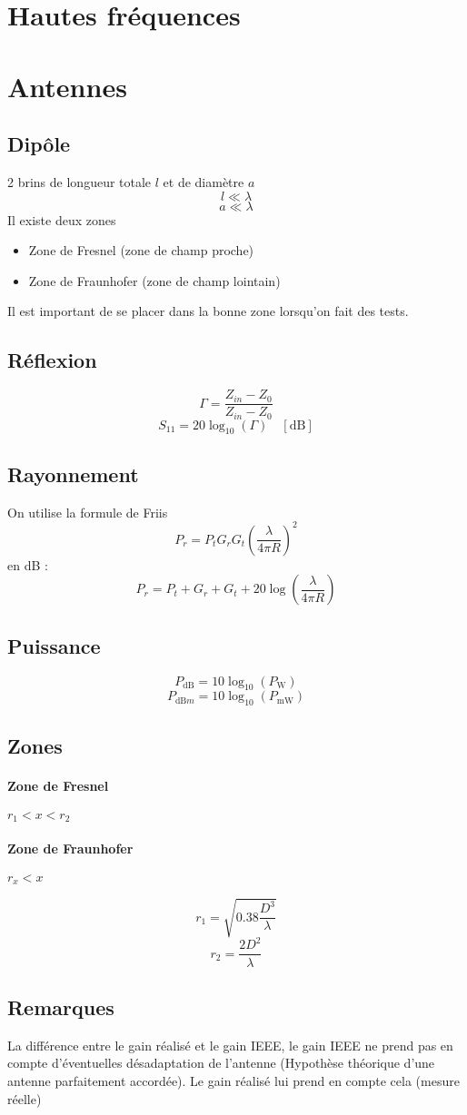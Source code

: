\documentclass[resume]{subfiles}
\begin{document}
\section{Hautes fréquences}
\section{Antennes}
\subsection{Dipôle}
2 brins de longueur totale $l$ et de diamètre $a$
$$l\ll \lambda$$
$$a\ll\lambda$$
Il existe deux zones
\begin{itemize}
\item Zone de Fresnel (zone de champ proche)
\item Zone de Fraunhofer (zone de champ lointain)
\end{itemize}
Il est important de se placer dans la bonne zone lorsqu'on fait des tests.
\subsection{Réflexion}
$$\Gamma=\frac{Z_{in}-Z_0}{Z_{in}-Z_0}$$
$$S_{11}=20\log_{10}(\Gamma)\quad [\si{\deci\bel}]$$
\subsection{Rayonnement}
On utilise la formule de Friis
$$P_r=P_tG_rG_t\left(\frac{\lambda}{4\pi R}\right)^2$$
en dB :
$$P_r=P_t+G_r+G_t+20\log\left(\frac{\lambda}{4\pi R}\right)$$
\subsection{Puissance}
$$\boxed{P_{\si{\deci\bel}}=10\log_{10}\left(P_{\si{\watt}}\right)}$$
$$\boxed{P_{\si{\deci\bel m}}=10\log_{10}\left(P_{\si{\milli\watt}}\right)}$$
\subsection{Zones}
\paragraph{Zone de Fresnel} $r_1 < x < r_2$
\paragraph{Zone de Fraunhofer} $ r_x < x$

$$r_1=\sqrt{0.38\frac{D^3}{\lambda}}$$
$$r_2=\frac{2D^2}{\lambda}$$
\subsection{Remarques}
La différence entre le gain réalisé et le gain IEEE, le gain IEEE ne prend pas en compte d'éventuelles désadaptation de l'antenne (Hypothèse théorique d'une antenne parfaitement accordée). Le gain réalisé lui prend en compte cela (mesure réelle)
\end{document}
